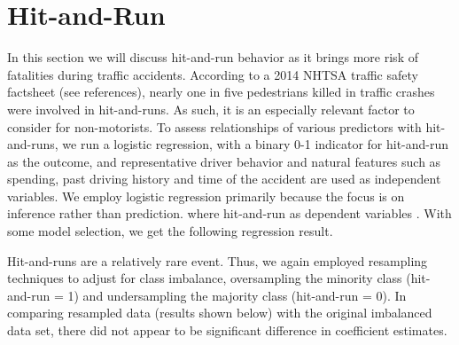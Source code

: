 \documentclass[11pt, oneside,titlepage]{article}   	%
\begin{document}
\section*{Hit-and-Run}
In this section we will discuss hit-and-run behavior as it brings more risk of fatalities during traffic accidents. According to a 2014 NHTSA traffic safety factsheet (see references), nearly one in five pedestrians killed in traffic crashes were involved in hit-and-runs. As such, it is an especially relevant factor to consider for non-motorists. To assess relationships of various predictors with hit-and-runs, we run a logistic regression, with a binary 0-1 indicator for hit-and-run as the outcome, and representative driver behavior and natural features such as spending, past driving history and time of the accident are used as independent variables. We employ logistic regression primarily because the focus is on inference rather than prediction. where hit-and-run as dependent variables . With some model selection, we get the following regression result.

Hit-and-runs are a relatively rare event. Thus, we again employed resampling techniques to adjust for class imbalance, oversampling the minority class (hit-and-run = 1) and undersampling the majority class (hit-and-run = 0). In comparing resampled data (results shown below) with the original imbalanced data set, there did not appear to be significant difference in coefficient estimates.
\end{document}
